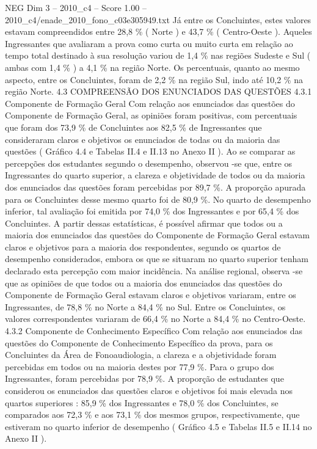 \begin{textsample}{NEG Dim 3 – 2010\_c4 – Score 1.00 – 2010\_c4/enade\_2010\_fono\_c03e305949.txt}
Já entre os Concluintes, estes valores estavam compreendidos entre 28,8 \% ( Norte ) e 43,7 \% ( Centro-Oeste ).
Aqueles Ingressantes que avaliaram a prova como curta ou muito curta em relação ao tempo total destinado à sua resolução variou de 1,4 \% nas regiões Sudeste e Sul ( ambas com 1,4 \% ) a 4,1 \% na região Norte.
Os percentuais, quanto ao mesmo aspecto, entre os Concluintes, foram de 2,2 \% na região Sul, indo até 10,2 \% na região Norte. 4.3 COMPREENSÃO DOS ENUNCIADOS DAS QUESTÕES 4.3.1 Componente de Formação Geral Com relação aos enunciados das questões do Componente de Formação Geral, as opiniões foram positivas, com percentuais que foram dos 73,9 \% de Concluintes aos 82,5 \% de Ingressantes que consideraram claros e objetivos os enunciados de todas ou da maioria das questões ( Gráfico 4.4 e Tabelas II.4 e II.13 no Anexo II ).
Ao se comparar as percepções dos estudantes segundo o desempenho, observou -se que, entre os Ingressantes do quarto superior, a clareza e objetividade de todos ou da maioria dos enunciados das questões foram percebidas por 89,7 \%.
A proporção apurada para os Concluintes desse mesmo quarto foi de 80,9 \%.
No quarto de desempenho inferior, tal avaliação foi emitida por 74,0 \% dos Ingressantes e por 65,4 \% dos Concluintes.
A partir dessas estatísticas, é possível afirmar que todos ou a maioria dos enunciados das questões do Componente de Formação Geral estavam claros e objetivos para a maioria dos respondentes, segundo os quartos de desempenho considerados, embora os que se situaram no quarto superior tenham declarado esta percepção com maior incidência.
Na análise regional, observa -se que as opiniões de que todos ou a maioria dos enunciados das questões do Componente de Formação Geral estavam claros e objetivos variaram, entre os Ingressantes, de 78,8 \% no Norte a 84,4 \% no Sul.
Entre os Concluintes, os valores correspondentes variaram de 66,4 \% no Norte a 84,4 \% no Centro-Oeste. 4.3.2 Componente de Conhecimento Específico Com relação aos enunciados das questões do Componente de Conhecimento Específico da prova, para os Concluintes da Área de Fonoaudiologia, a clareza e a objetividade foram percebidas em todos ou na maioria destes por 77,9 \%.
Para o grupo dos Ingressantes, foram percebidas por 78,9 \%.
A proporção de estudantes que considerou os enunciados das questões claros e objetivos foi mais elevada nos quartos superiores : 85,9 \% dos Ingressantes e 78,0 \% dos Concluintes, se comparados aos 72,3 \% e aos 73,1 \% dos mesmos grupos, respectivamente, que estiveram no quarto inferior de desempenho ( Gráfico 4.5 e Tabelas II.5 e II.14 no Anexo II ).

\end{textsample}

